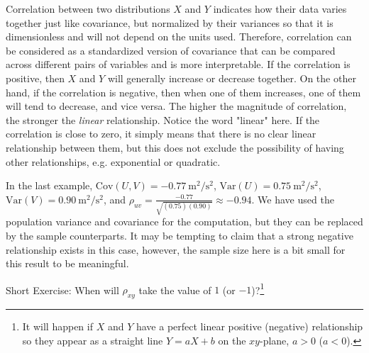 Correlation between two distributions $X$ and $Y$ indicates how their data varies together just like covariance, but normalized by their variances so that it is dimensionless and will not depend on the units used. Therefore, correlation can be considered as a standardized version of covariance that can be compared across different pairs of variables and is more interpretable. If the correlation is positive, then $X$ and $Y$ will generally increase or decrease together. On the other hand, if the correlation is negative, then when one of them increases, one of them will tend to decrease, and vice versa. The higher the magnitude of correlation, the stronger the \textit{linear} relationship. Notice the word "linear" here. If the correlation is close to zero, it simply means that there is no clear linear relationship between them, but this does not exclude the possibility of having other relationships, e.g. exponential or quadratic.\par
In the last example, $\text{Cov}(U,V) = \SI{-0.77}{\square\m \per \square\s}$, $\text{Var}(U) = \SI{0.75}{\square\m \per \square\s}$, $\text{Var}(V) = \SI{0.90}{\square\m \per \square\s}$, and $\rho_{uv} = \frac{-0.77}{\sqrt{(0.75)(0.90)}} \approx -0.94$. We have used the population variance and covariance for the computation, but they can be replaced by the sample counterparts. It may be tempting to claim that a strong negative relationship exists in this case, however, the sample size here is a bit small for this result to be meaningful. \par
Short Exercise: When will $\rho_{xy}$ take the value of $1$ (or $-1$)?\footnote{It will happen if $X$ and $Y$ have a perfect linear positive (negative) relationship so they appear as a straight line $Y = aX + b$ on the $xy$-plane, $a > 0$ ($a < 0$).}\par

